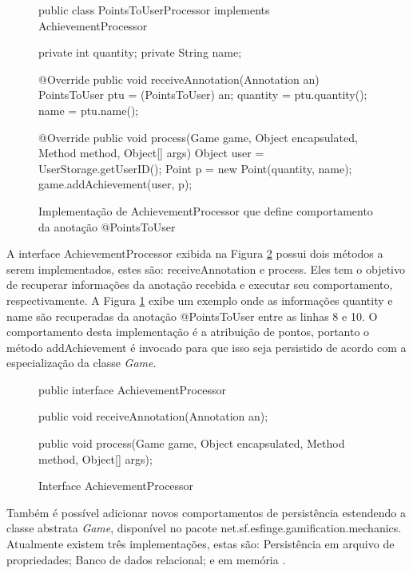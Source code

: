 \begin{figure}[H]
    \centering
    \caption{Implementação de AchievementProcessor que define comportamento da anotação @PointsToUser}
\begin{java}
public class PointsToUserProcessor implements AchievementProcessor {
	
	private int quantity;
	private String name;

	@Override
	public void receiveAnnotation(Annotation an) {
		PointsToUser ptu = (PointsToUser) an;
		quantity = ptu.quantity();
		name = ptu.name();
	}

	@Override
	public void process(Game game, Object encapsulated, Method method, Object[] args) {
		Object user = UserStorage.getUserID();
		Point p = new Point(quantity, name);
		game.addAchievement(user, p);
	}
}
    \end{java}
    \label{fig:achievement-processor-implementado}
\end{figure}

\par A interface AchievementProcessor exibida na Figura \ref{fig:achievement-processor} possui dois métodos a serem implementados, estes são: receiveAnnotation e process. Eles tem o objetivo de recuperar informações da anotação recebida e executar seu comportamento, respectivamente. A Figura \ref{fig:achievement-processor-implementado} exibe um exemplo onde as informações quantity e name são recuperadas da anotação @PointsToUser entre as linhas 8 e 10. O comportamento desta implementação é a atribuição de pontos, portanto o método addAchievement é invocado para que isso seja persistido de acordo com a especialização da classe \textit{Game}.

\begin{figure}[H]
    \centering
    \caption{Interface AchievementProcessor}
    \begin{java}
public interface AchievementProcessor {
	
	public void receiveAnnotation(Annotation an);
	
	public void process(Game game, Object encapsulated, Method method, Object[] args);

}
    \end{java}
    \label{fig:achievement-processor}
\end{figure}

Também é possível adicionar novos comportamentos de persistência estendendo a classe abstrata \textit{Game}, disponível no pacote net.sf.esfinge.gamification.mechanics. Atualmente existem três implementações, estas são: Persistência em arquivo de propriedades; Banco de dados relacional; e em memória \cite{esfingegamification2011}.

